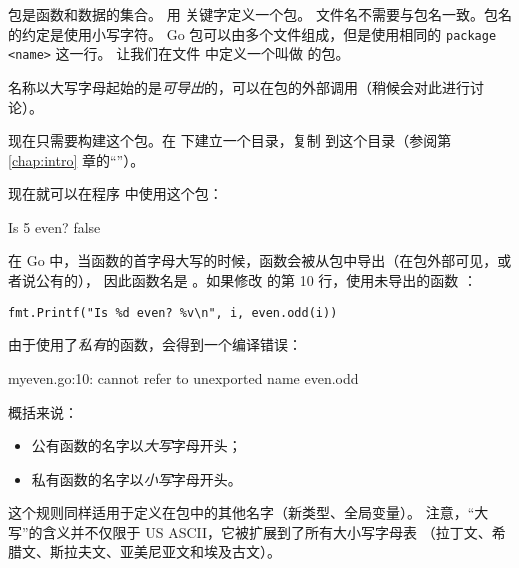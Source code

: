 \noindent{}
包是函数和数据的集合。
用  关键字定义一个包。
文件名不需要与包名一致。包名的约定是使用小写字符。
Go 包可以由多个文件组成，但是使用相同的 \lstinline{package <name>} 这一行。
让我们在文件  中定义一个叫做  的包。


名称以大写字母起始的是\emph{可导出}的，可以在包的外部调用（稍候会对此进行讨论）。

现在只需要构建这个包。在  下建立一个目录，复制
 到这个目录（参阅第 \ref{chap:intro} 章的``''）。

\begin{display}
\pr {}
\pr {}
\pr {}
\pr {}
\end{display}

现在就可以在程序  中使用这个包：


\showremarks

\begin{display}
\pr {}
\pr {}
Is 5 even? false
\end{display}

在 Go 中，当函数的首字母大写的时候，函数会被从包中导出（在包外部可见，或者说公有的），
因此函数名是 。如果修改  的第 10 行，使用未导出的函数
：

\noindent\lstinline{fmt.Printf("Is %d even? %v\n", i, even.odd(i))}

由于使用了\emph{私有}的函数，会得到一个编译错误：
\begin{display}
myeven.go:10: cannot refer to unexported name even.odd
\end{display}

\noindent{}概括来说：
\begin{itemize}
\item 公有函数的名字以\emph{大写}字母开头；
\item 私有函数的名字以\emph{小写}字母开头。
\end{itemize}
这个规则同样适用于定义在包中的其他名字（新类型、全局变量）。
注意，``大写''的含义并不仅限于 US ASCII，它被扩展到了所有大小写字母表
（拉丁文、希腊文、斯拉夫文、亚美尼亚文和埃及古文）。

